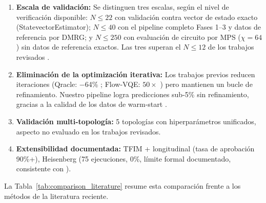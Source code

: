\documentclass[11pt,a4paper,spanish]{book}
\begin{document}
\begin{enumerate}
    \item \textbf{Escala de validación:} Se distinguen tres escalas, según el nivel de verificación disponible: $N \leq 22$ con validación contra vector de estado exacto (StatevectorEstimator); $N \leq 40$ con el pipeline completo Fases 1--3 y datos de referencia por DMRG; y $N \leq 250$ con evaluación de circuito por MPS ($\chi = 64$) sin datos de referencia exactos. Las tres superan el $N \leq 12$ de los trabajos revisados \citep{miao2024, zhang2025, zou2026}.

    \item \textbf{Eliminación de la optimización iterativa:} Los trabajos previos reducen iteraciones (Qracle: $-$64\% \citep{zhang2025}; Flow-VQE: $50\times$ \citep{zou2026}) pero mantienen un bucle de refinamiento. Nuestro pipeline logra predicciones sub-5\% sin refinamiento, gracias a la calidad de los datos de warm-start \citep{puig2025, schiffer2026}.

    \item \textbf{Validación multi-topología:} 5 topologías con hiperparámetros unificados, aspecto no evaluado en los trabajos revisados.

    \item \textbf{Extensibilidad documentada:} TFIM + longitudinal (tasa de aprobación 90\%+), Heisenberg (75 ejecuciones, 0\%, límite formal documentado, consistente con \citet{wiersema2020, huang2026frustration}).
\end{enumerate}

La Tabla~\ref{tab:comparison_literature} resume esta comparación frente a los métodos de la literatura reciente.
\end{document}
